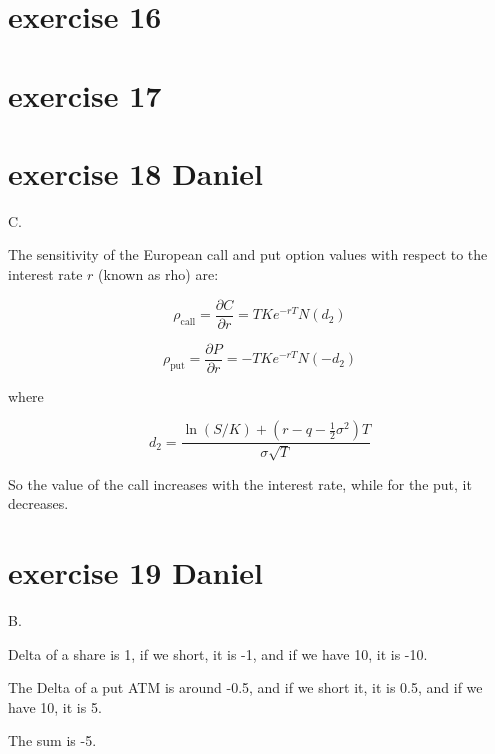 \documentclass{article}
\begin{document}
\section{exercise 16}
\section{exercise 17}
\section{exercise 18 Daniel}
C.

The sensitivity of the European call and put option values with respect to the interest rate \( r \) (known as rho) are:

\[
    \rho_{\text{call}} = \frac{\partial C}{\partial r} = T K e^{-rT} N(d_2)
\]

\[
    \rho_{\text{put}} = \frac{\partial P}{\partial r} = -T K e^{-rT} N(-d_2)
\]

where

\[
    d_2 = \frac{\ln(S/K) + (r - q - \tfrac{1}{2} \sigma^2) T}{\sigma \sqrt{T}}
\]

So the value of the call increases with the interest rate, while for the put, it decreases.

\section{exercise 19 Daniel}
B.

Delta of a share is 1, if we short, it is -1, and if we have 10, it is -10.

The Delta of a put ATM is around -0.5, and if we short it, it is 0.5, and if we have 10, it is 5.

The sum is -5.
\end{document}
